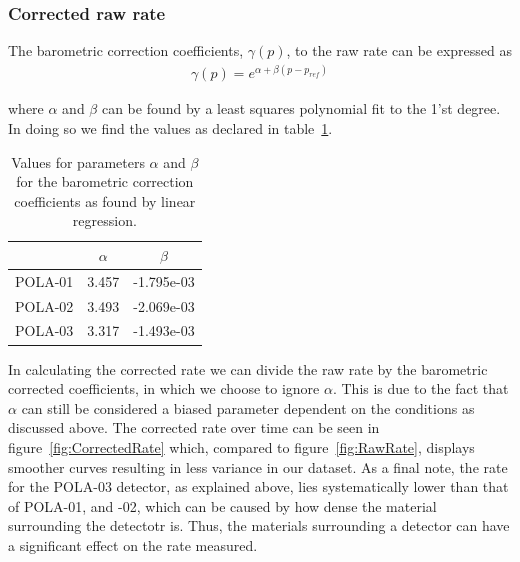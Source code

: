 \documentclass[12pt,a4paper]{amsart}
\begin{document}
\subsubsection{Corrected raw rate}
The barometric correction coefficients, $\gamma(p)$, to the raw rate can be expressed as
\begin{align}
\gamma(p) = e^{\alpha + \beta(p-p_{ref})}
\end{align}

where $\alpha$ and $\beta$ can be found by a least squares polynomial fit to the 1'st degree. In doing so we find the values as declared in table~\ref{tab:alpha_beta}.

\begin{table}[]
\caption{Values for parameters $\alpha$ and $\beta$ for the barometric correction coefficients as found by linear regression.}
\label{tab:alpha_beta}
\begin{tabular}{c|cc}
\hline\hline
        & $\alpha$ & $\beta$    \\ \hline
POLA-01 & 3.457    & -1.795e-03 \\
POLA-02 & 3.493    & -2.069e-03 \\
POLA-03 & 3.317    & -1.493e-03 \\
\hline\hline
\end{tabular}
\end{table}

In calculating the corrected rate we can divide the raw rate by the barometric corrected coefficients, in which we choose to ignore $\alpha$. This is due to the fact that $\alpha$ can still be considered a biased parameter dependent on the conditions as discussed above. The corrected rate over time can be seen in figure~\ref{fig:CorrectedRate} which, compared to figure~\ref{fig:RawRate}, displays smoother curves resulting in less variance in our dataset. As a final note, the rate for the POLA-03 detector, as explained above, lies systematically lower than that of POLA-01, and -02, which can be caused by how dense the material surrounding the detectotr is. Thus, the materials surrounding a detector can have a significant effect on the rate measured.
\end{document}
